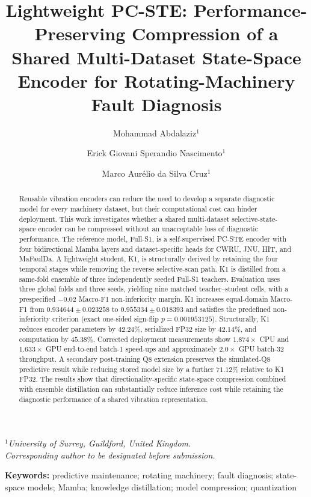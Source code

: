 \documentclass[11pt]{article}
\title{\textbf{Lightweight PC-STE: Performance-Preserving Compression of a Shared Multi-Dataset State-Space Encoder for Rotating-Machinery Fault Diagnosis}}
\author{
Mohammad Abdalaziz$^{1}$ \and
Erick Giovani Sperandio Nascimento$^{1}$ \and
Marco Aur\'elio da Silva Cruz$^{1}$
}
\date{}
\begin{document}
\maketitle

\begin{center}
$^{1}$\textit{University of Surrey, Guildford, United Kingdom.}\\
\textit{Corresponding author to be designated before submission.}
\end{center}

\begin{abstract}
Reusable vibration encoders can reduce the need to develop a separate diagnostic model for every machinery dataset, but their computational cost can hinder deployment. This work investigates whether a shared multi-dataset selective-state-space encoder can be compressed without an unacceptable loss of diagnostic performance. The reference model, Full-S1, is a self-supervised PC-STE encoder with four bidirectional Mamba layers and dataset-specific heads for CWRU, JNU, HIT, and MaFaulDa. A lightweight student, K1, is structurally derived by retaining the four temporal stages while removing the reverse selective-scan path. K1 is distilled from a same-fold ensemble of three independently seeded Full-S1 teachers. Evaluation uses three global folds and three seeds, yielding nine matched teacher--student cells, with a prespecified $-0.02$ Macro-F1 non-inferiority margin. K1 increases equal-domain Macro-F1 from $0.934644\pm0.023258$ to $0.955334\pm0.018393$ and satisfies the predefined non-inferiority criterion (exact one-sided sign-flip $p=0.001953125$). Structurally, K1 reduces encoder parameters by $42.24\%$, serialized FP32 size by $42.14\%$, and computation by $45.38\%$. Corrected deployment measurements show $1.874\times$ CPU and $1.633\times$ GPU end-to-end batch-1 speed-ups and approximately $2.0\times$ GPU batch-32 throughput. A secondary post-training Q8 extension preserves the simulated-Q8 predictive result while reducing stored model size by a further $71.12\%$ relative to K1 FP32. The results show that directionality-specific state-space compression combined with ensemble distillation can substantially reduce inference cost while retaining the diagnostic performance of a shared vibration representation.
\end{abstract}

\noindent\textbf{Keywords:} predictive maintenance; rotating machinery; fault diagnosis; state-space models; Mamba; knowledge distillation; model compression; quantization
\end{document}
